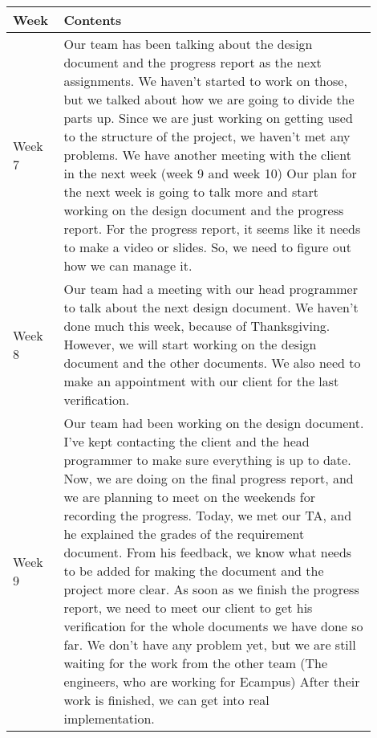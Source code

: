 \documentclass[10pt]{article}
\begin{document}
\begin{center}
        \begin{tabular}{ | p{0.1\linewidth} | p{0.8\linewidth} | } \hline
            Week & Contents  \\ \hline                    
            Week 7 & Our team has been talking about the design document and the progress report as the next assignments. We haven't started to work on those, but we talked about how we are going to divide the parts up.
            Since we are just working on getting used to the structure of the project, we haven't met any problems.
            We have another meeting with the client in the next week (week 9 and week 10)
            Our plan for the next week is going to talk more and start working on the design document and the progress report.
            For the progress report, it seems like it needs to make a video or slides. So, we need to figure out how we can manage it.  \\ \hline 
            Week 8 &  Our team had a meeting with our head programmer to talk about the next design document. We haven't done much this week, because of Thanksgiving.
            However, we will start working on the design document and the other documents.
            We also need to make an appointment with our client for the last verification. \\ \hline 
            Week 9 & Our team had been working on the design document.
            I've kept contacting the client and the head programmer to make sure everything is up to date.
            Now, we are doing on the final progress report, and we are planning to meet on the weekends for recording the progress.
            Today, we met our TA, and he explained the grades of the requirement document.
            From his feedback, we know what needs to be added for making the document and the project more clear.
            As soon as we finish the progress report, we need to meet our client to get his verification for the whole documents we have done so far.
            We don't have any problem yet, but we are still waiting for the work from the other team (The engineers, who are working for Ecampus)
            After their work is finished, we can get into real implementation.  \\ \hline 
        \end{tabular}
        \end{center}
\end{document}

